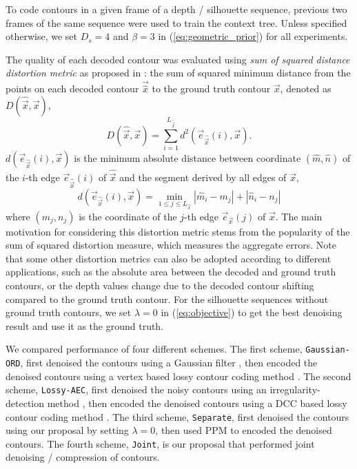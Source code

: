 To code contours in a given frame of a depth / silhouette sequence, previous two frames of the same sequence were used to train the context tree.
Unless specified otherwise, we set $D_s=4$ and $\beta = 3$ in (\ref{eq:geometric_prior}) for all experiments.

The quality of each decoded contour was evaluated using \textit{sum of squared distance distortion metric} as proposed in \cite{katsaggelos1998mpeg}: the sum of squared minimum distance from the points on each decoded contour $\vec{\hat{x}}$ to the ground truth contour $\vec{x}$, denoted as $D(\hat{\vec{x}}, \vec{x})$,
\begin{equation}
D(\hat{\vec{x}},\vec{x}) = \sum_{i=1}^{L_{\hat{\vec{x}}}} d^2(\vec{e}_{\hat{\vec{x}}}(i), \vec{x}).
\end{equation}
$d(\vec{e}_{\hat{\vec{x}}}(i), \vec{x})$ is the minimum absolute distance between coordinate $(\hat{m}, \hat{n})$ of the $i$-th edge $\vec{e}_{\hat{\vec{x}}}(i)$ of $\hat{\vec{x}}$ and the segment derived by all edges of $\vec{x}$,
\begin{equation}
d(\vec{e}_{\hat{\vec{x}}}(i), \vec{x}) = \underset{1\leq j \leq L_{\vec{x}}}{\min} |\hat{m}_i-m_j|+|\hat{n}_i-n_j|
\end{equation}
where $(m_j,n_j)$ is the coordinate of the $j$-th edge $\vec{e}_{\vec{x}}(j)$ of $\vec{x}$. 
The main motivation for considering this distortion metric stems from the popularity of the sum of squared distortion measure, which measures the aggregate errors.
Note that some other distortion metrics can also be adopted according to different applications, such as the absolute area between the decoded and ground truth contours, or the depth values change due to the decoded contour shifting compared to the ground truth contour.
For the silhouette sequences without ground truth contours, we set $\lambda=0$ in (\ref{eq:objective}) to get the best denoising result and use it as the ground truth.

We compared performance of four different schemes.
The first scheme, \texttt{Gaussian-ORD}, first denoised the contours using a Gaussian filter \cite{zhong2010convergence}, then encoded the denoised contours using a vertex based lossy contour coding method \cite{lai2010arbitrary}.
The second scheme, \texttt{Lossy-AEC}, first denoised the noisy contours using an irregularity-detection method \cite{daribo14}, then encoded the denoised contours using a DCC based lossy contour coding method \cite{yuan2015contour}.
The third scheme, \texttt{Separate}, first denoised the contours using our proposal by setting $\lambda=0$, then used PPM to encoded the denoised contours.
The fourth scheme, \texttt{Joint}, is our proposal that performed joint denoising / compression of contours.

